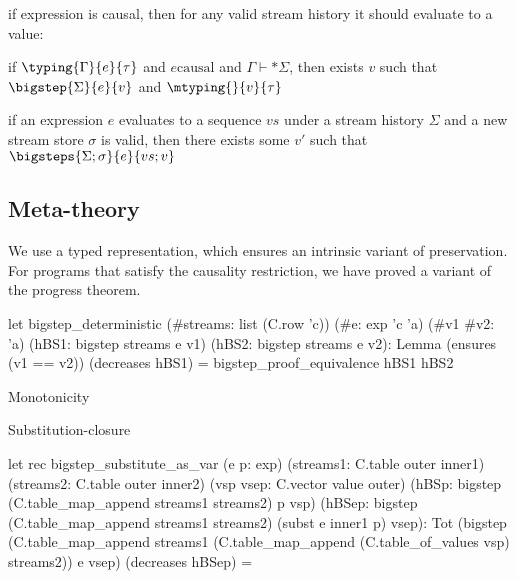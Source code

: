   
  \begin{lemma}[progress]
    if expression is causal, then for any valid stream history it should evaluate to a value:
  
    if $\typing{\Gamma}{e}{\tau}$ and $e \mbox{causal}$ and $\Gamma \vdash* \Sigma$, then exists $v$ such that
    $\bigstep{\Sigma}{e}{v}$ and $\mtyping{}{v}{\tau}$
  \end{lemma}
  
  \begin{lemma}
    if an expression $e$ evaluates to a sequence $vs$ under a stream history $\Sigma$ and a new stream store $\sigma$ is valid, then
    there exists some $v'$ such that
    $\bigsteps{\Sigma; \sigma}{e}{vs; v}$
  \end{lemma}
  
  \subsection{Meta-theory}
  \label{ss:meta-theory}
  
  We use a typed representation, which ensures an intrinsic variant of preservation.
  For programs that satisfy the causality restriction, we have proved a variant of the progress theorem.
  
  \begin{code}
  let bigstep_deterministic
    (#streams: list (C.row 'c))
    (#e: exp 'c 'a)
    (#v1 #v2: 'a)
    (hBS1: bigstep streams e v1) (hBS2: bigstep streams e v2):
      Lemma (ensures (v1 == v2)) (decreases hBS1) =
    bigstep_proof_equivalence hBS1 hBS2
  \end{code}
  
  Monotonicity
  
  Substitution-closure
  \begin{code}
  let rec bigstep_substitute_as_var (e p: exp)
    (streams1: C.table outer inner1)
    (streams2: C.table outer inner2)
    (vsp vsep: C.vector value outer)
    (hBSp: bigstep (C.table_map_append streams1 streams2) p vsp)
    (hBSep: bigstep (C.table_map_append streams1 streams2) (subst e inner1 p) vsep):
      Tot (bigstep (C.table_map_append streams1 (C.table_map_append (C.table_of_values vsp) streams2)) e vsep) (decreases hBSep) =
  
  \end{code}
  
